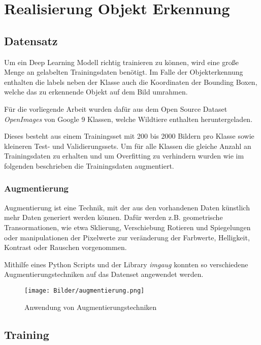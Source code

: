 \chapter{Realisierung Objekt Erkennung}\label{kap:object_det}

\section{Datensatz}\label{sec:dataset}

Um ein Deep Learning Modell richtig trainieren zu können, 
wird eine große Menge an gelabelten Trainingsdaten benötigt.
Im Falle der Objekterkennung enthalten die labels neben der 
Klasse auch die Koordinaten der Bounding Boxen, 
welche das zu erkennende Objekt auf dem Bild umrahmen.


Für die vorliegende Arbeit wurden dafür aus dem Open Source 
Dataset \textit{OpenImages} \cite{kuznetsovaOpenImagesDataset2018} 
von Google 9 Klassen, welche Wildtiere enthalten heruntergeladen.

Dieses besteht aus einem Trainingsset mit 200 bis 2000 Bildern pro 
Klasse sowie kleineren Test- und Validierungssets. Um für alle Klassen 
die gleiche Anzahl an Trainingsdaten zu erhalten und um Overfitting zu 
verhindern wurden wie im folgenden beschrieben die Trainingsdaten 
augmentiert.

\subsection{Augmentierung}

Augmentierung ist eine Technik, mit der aus den vorhandenen 
Daten künstlich mehr Daten generiert werden können. Dafür werden 
z.B. geometrische Transormationen, wie etwa Sklierung, Verschiebung 
Rotieren und Spiegelungen oder manipulationen der Pixelwerte 
zur veränderung der Farbwerte, Helligkeit, Kontrast oder 
Rauschen vorgenommen.

Mithilfe eines Python Scripts und der Library \textit{imgaug} \cite{imgaug}
konnten so verschiedene Augmentierungstechniken auf das Datenset angewendet
werden.

\begin{figure}[H]
    \centering
    \label{fig:augmentierung}
    \texttt{[image: Bilder/augmentierung.png]}
    \caption{Anwendung von Augmentierungstechniken}
\end{figure}


\section{Training}

